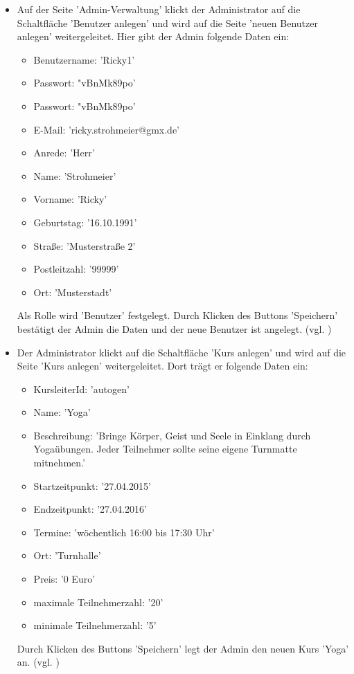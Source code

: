 \documentclass[a4paper]{scrreprt}
\begin{document}
\begin{itemize}
				\item {} 
				 Auf der Seite 'Admin-Verwaltung' klickt der Administrator auf die Schaltfläche 'Benutzer anlegen' und wird auf die Seite 'neuen Benutzer anlegen' weitergeleitet. Hier gibt der Admin folgende Daten ein:
					\begin{itemize}
						\item Benutzername: 'Ricky1' 
						\item Passwort: "vBnMk89po'
						\item Passwort: "vBnMk89po'
						\item E-Mail: 'ricky.strohmeier@gmx.de'
						\item Anrede: 'Herr'
						\item Name: 'Strohmeier'
						\item Vorname: 'Ricky'
						\item Geburtstag: '16.10.1991'
						\item Straße: 'Musterstraße 2'
						\item Postleitzahl: '99999'
						\item Ort: 'Musterstadt'
					\end{itemize}
				 Als Rolle wird 'Benutzer' festgelegt. Durch Klicken des Buttons 'Speichern' bestätigt der Admin die Daten und der neue Benutzer ist angelegt. (vgl. )
				
				\item {}
			 	 Der Administrator klickt auf die Schaltfläche 'Kurs anlegen' und wird auf die Seite 'Kurs anlegen' weitergeleitet. Dort trägt er folgende Daten ein:
						\begin{itemize}
							\item KursleiterId: 'autogen'
							\item Name: 'Yoga'
							\item Beschreibung: 'Bringe Körper, Geist und Seele in Einklang durch Yogaübungen. Jeder Teilnehmer sollte seine eigene Turnmatte mitnehmen.'
							\item Startzeitpunkt: '27.04.2015'
							\item Endzeitpunkt: '27.04.2016'
							\item Termine: 'wöchentlich 16:00 bis 17:30 Uhr'
							\item Ort: 'Turnhalle'
							\item Preis: '0 Euro'
							\item maximale Teilnehmerzahl: '20'	
							\item minimale Teilnehmerzahl: '5'
						\end{itemize}
				 Durch Klicken des Buttons 'Speichern' legt der Admin den neuen Kurs 'Yoga' an. (vgl. )
				

\end{itemize}
\end{document}
